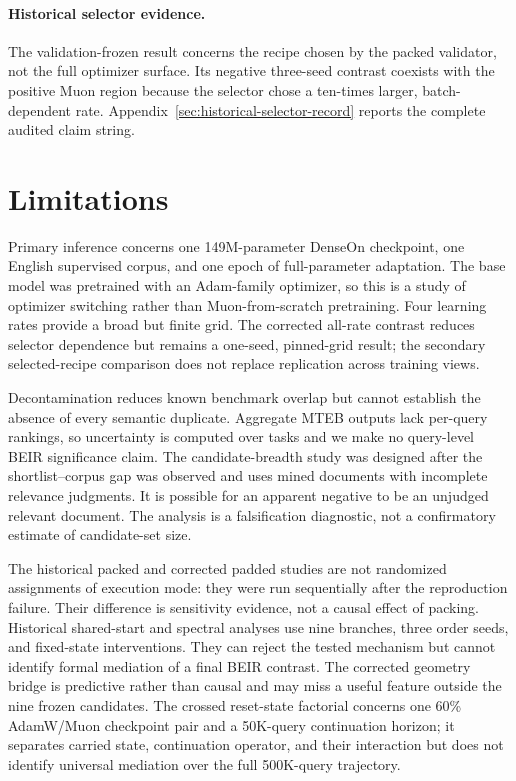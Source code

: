 \documentclass[11pt]{article}
\begin{document}
\paragraph{Historical selector evidence.}
The validation-frozen result concerns the recipe chosen by the packed validator, not the full
optimizer surface. Its negative three-seed contrast coexists with the positive Muon region because
the selector chose a ten-times larger, batch-dependent rate. Appendix~\ref{sec:historical-selector-record}
reports the complete audited claim string.

\CandidateBreadthConclusion

\label{paper-main-end}

\section{Limitations}

Primary inference concerns one 149M-parameter DenseOn checkpoint, one English supervised corpus,
and one epoch of full-parameter adaptation. The base model was pretrained with an Adam-family
optimizer, so this is a study of optimizer switching rather than Muon-from-scratch pretraining.
Four learning rates provide a broad but finite grid. The corrected all-rate contrast reduces
selector dependence but remains a one-seed, pinned-grid result; the secondary selected-recipe
comparison does not replace replication across training views.

Decontamination reduces known benchmark overlap but cannot establish the absence of every semantic
duplicate. Aggregate MTEB outputs lack per-query rankings, so uncertainty is computed over tasks and
we make no query-level BEIR significance claim. The candidate-breadth study was designed after the
shortlist--corpus gap was observed and uses mined documents with incomplete relevance judgments. It
is possible for an apparent negative to be an unjudged relevant document. The analysis is a
falsification diagnostic, not a confirmatory estimate of candidate-set size.

The historical packed and corrected padded studies are not randomized assignments of execution
mode: they were run sequentially after the reproduction failure. Their difference is sensitivity
evidence, not a causal effect of packing. Historical shared-start and spectral analyses use nine
branches, three order seeds, and fixed-state interventions. They can reject the tested mechanism but
cannot identify formal mediation of a final BEIR contrast. The corrected geometry bridge is
predictive rather than causal and may miss a useful feature outside the nine frozen candidates.
The crossed reset-state factorial concerns one 60\% AdamW/Muon checkpoint pair and a 50K-query
continuation horizon; it separates carried state, continuation operator, and their interaction but
does not identify universal mediation over the full 500K-query trajectory.
\end{document}
